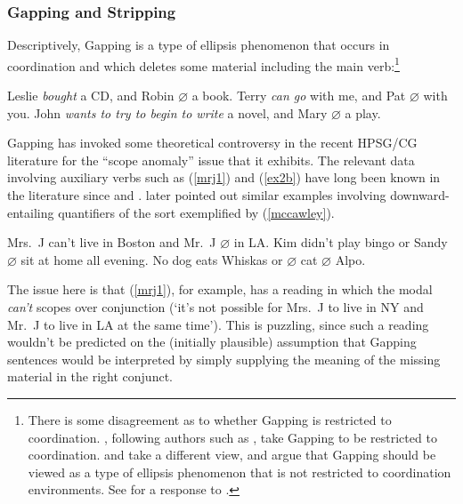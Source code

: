 \documentclass[output=paper
                ,modfonts
 	        ,biblatex
                ,babelshorthands
                ,newtxmath
                ,draftmode
                ,colorlinks, citecolor=brown
]{langscibook}
\begin{document}
\subsubsection{Gapping and Stripping \label{sec:gapping}}

Descriptively, Gapping is a type of ellipsis phenomenon that occurs in
coordination and which deletes some material including the main
verb:\footnote{There is some disagreement as to whether Gapping is
restricted to coordination. \citet{kubota-levine-gapping}, following
authors such as \citet{johnson2009}, take Gapping to be restricted to
coordination. \citet{parkea18gapping} and \citet{parkDiss} take a
different view, and argue that Gapping should be viewed as a type of
ellipsis phenomenon that is not restricted to coordination
environments. See \citet[46--47]{KubotaLevineBook} for a response to
\citet{parkea18gapping}.}

\begin{exe}
 \ex\label{gapping}
  \begin{xlist}
 \ex
    Leslie \emph{bought} a CD, and Robin   \ensuremath{\varnothing}  a book.
 \ex
    Terry \emph{can go} with me, and Pat  \ensuremath{\varnothing}  with you.
 \ex
    John \emph{wants to try to begin to write} a novel, and Mary  \ensuremath{\varnothing}  a play.
  \end{xlist}
\end{exe}
Gapping has invoked some theoretical controversy in the recent
HPSG/CG literature for the ``scope anomaly'' issue that it exhibits.
The relevant data involving auxiliary verbs such as (\ref{mrj1}) and (\ref{ex2b})
have long been known in the literature since
\citet{oehrle71,oehrle1987} and 
\citet{siegel87}. \citet[247]{mccawley1993} later pointed out similar examples
involving downward-entailing quantifiers of the sort exemplified by (\ref{mccawley}).

\begin{exe}
 \ex\label{scope}
  \begin{xlist}
 \ex\label{mrj1}
    Mrs.\ J can't live in Boston and Mr.\ J  \ensuremath{\varnothing}  in LA.
 \ex\label{ex2b}
    Kim didn't play bingo or Sandy  \ensuremath{\varnothing}  sit at home all evening.
 \ex\label{mccawley}
    No dog eats Whiskas or  \ensuremath{\varnothing}  cat  \ensuremath{\varnothing}  Alpo.
  \end{xlist}
\end{exe}
The issue here is that (\ref{mrj1}), for example, has a reading in
which the modal \textit{can't} scopes over conjunction (`it's not
possible for Mrs.~J to live in NY and Mr.~J to live in LA at the same
time'). This is puzzling, since such a reading wouldn't be predicted
on the (initially plausible) assumption that Gapping sentences would
be interpreted by simply supplying the meaning of the missing material
in the right conjunct.
\end{document}
